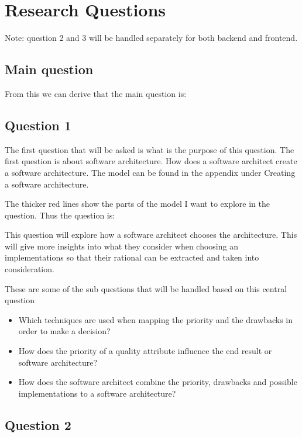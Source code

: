 \section{Research Questions}
Note: question 2 and 3 will be handled separately for both backend and frontend.

\subsection{Main question}
From this we can derive that the main question is:


\subsection{Question 1}
\label{sec:Question1}
The first question that will be asked is what is the purpose of this question. The first question is about software architecture. How does a software architect create a software architecture. The model can be found in the appendix under Creating a software architecture.

The thicker red lines show the parts of the model I want to explore in the question. Thus the question is:


This question will explore how a software architect chooses the architecture. This will give more insights into what they consider when choosing an implementations so that their rational can be extracted and taken into consideration.

These are some of the sub questions that will be handled based on this central question
\begin{itemize}
	\item Which techniques are used when mapping the priority and the drawbacks in order to make a decision?
	\item How does the priority of a quality attribute influence the end result or software architecture?
	\item How does the software architect combine the priority, drawbacks and possible implementations to a software architecture?
\end{itemize}

\subsection{Question 2}

